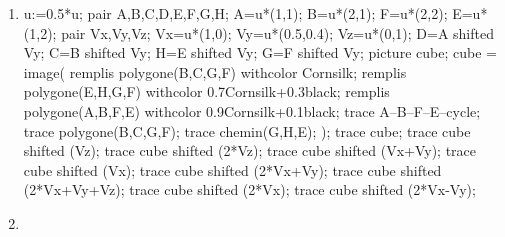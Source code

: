 \begin{exercice*}
\begin{multicols}{2}
\begin{enumerate}
\begin{Geometrie}
                F=u*(2,2);
                E=u*(1,2);
                pair Vx,Vy,Vz;
                Vx=u*(1,0);
                Vy=u*(0.5,0.4);
                Vz=u*(0,1);
                D=A shifted Vy;
                C=B shifted Vy;
                H=E shifted Vy;
                G=F shifted Vy;
                picture cube;
                cube = image(
                    remplis polygone(B,C,G,F) withcolor Cornsilk;
                    remplis polygone(E,H,G,F) withcolor 0.7Cornsilk+0.3black;
                    remplis polygone(A,B,F,E) withcolor 0.9Cornsilk+0.1black;
                    trace A--B--F--E--cycle;
                    trace polygone(B,C,G,F);
                    trace chemin(G,H,E);
                );        
                trace cube;
                trace cube shifted (Vx+Vy);
                trace cube shifted (Vx);
                trace cube shifted (Vx+Vy+Vz);
                trace cube shifted (Vx+Vy+2*Vz);
                trace cube shifted (2*Vx+Vy);
                trace cube shifted (3*Vx+Vy);
                trace cube shifted (3*Vx);
            \end{Geometrie}
            \item
            \begin{Geometrie}
                u:=0.5*u;
                pair A,B,C,D,E,F,G,H;
                A=u*(1,1);
                B=u*(2,1);
                F=u*(2,2);
                E=u*(1,2);
                pair Vx,Vy,Vz;
                Vx=u*(1,0);
                Vy=u*(0.5,0.4);
                Vz=u*(0,1);
                D=A shifted Vy;
                C=B shifted Vy;
                H=E shifted Vy;
                G=F shifted Vy;
                picture cube;
                cube = image(
                    remplis polygone(B,C,G,F) withcolor Cornsilk;
                    remplis polygone(E,H,G,F) withcolor 0.7Cornsilk+0.3black;
                    remplis polygone(A,B,F,E) withcolor 0.9Cornsilk+0.1black;
                    trace A--B--F--E--cycle;
                    trace polygone(B,C,G,F);
                    trace chemin(G,H,E);
                );        
                trace cube;
                trace cube shifted (Vz);
                trace cube shifted (2*Vz);
                trace cube shifted (Vx+Vy);
                trace cube shifted (Vx);
                trace cube shifted (2*Vx+Vy);
                trace cube shifted (2*Vx+Vy+Vz);
                trace cube shifted (2*Vx);
                trace cube shifted (2*Vx-Vy);
            \end{Geometrie}
            \item

\end{enumerate}
\end{multicols}
\end{exercice*}
